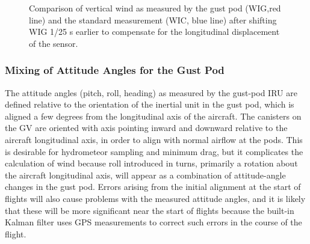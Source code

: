 \documentclass[12pt,twoside,english]{article}\usepackage[]{graphicx}\usepackage[]{color}
\let\OrgIndex\index
\renewcommand*{\index}[1]{\OrgIndex{#1}}
\begin{document}
{{\begin{figure}
\protect\caption{\label{fig:FurtherExpandedWIGshifted}Comparison of vertical wind as measured by the gust pod (WIG,red line) and the standard measurement (WIC, blue line) after shifting WIG 1/25 s earlier to compensate for the longitudinal displacement of the sensor.} 
\end{figure}


\subsubsection{Mixing of Attitude Angles for the Gust Pod}



The attitude angles (pitch, roll,  heading) as measured by the gust-pod IRU are defined relative to the orientation of the inertial unit in the gust pod, which is aligned a few degrees from the longitudinal axis of the aircraft. The canisters on the GV are oriented with axis pointing inward and downward relative to the aircraft longitudinal axis, in order to align with normal airflow at the pods. This is desirable for hydrometeor sampling and minimum drag, but it complicates the calculation of wind because roll introduced in turns, primarily a rotation about the aircraft longitudinal axis, will appear as a combination of attitude-angle changes in the gust pod. Errors arising from the initial alignment at the start of flights will also cause problems with the measured attitude angles, and it is likely that these will be more significant near the start of flights because the built-in Kalman filter uses GPS measurements to correct such errors in the course of the flight. 

}}
\end{document}
